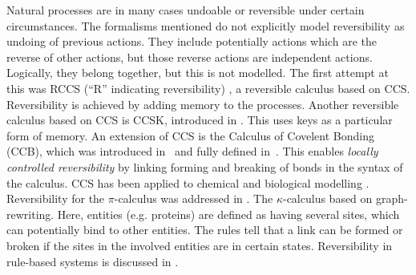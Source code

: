 Natural processes are in many cases undoable or reversible under certain circumstances. The formalisms mentioned do not explicitly model reversibility as undoing of previous actions. They include potentially actions which are the reverse of other actions, but those reverse actions are independent actions. Logically, they belong together, but this is not modelled. The first attempt at this was RCCS (“R” indicating reversibility) \cite{10.1007/978-3-540-28644-8_19}, a reversible calculus based on CCS. Reversibility is achieved by adding memory to the processes. Another reversible calculus based on CCS is CCSK, introduced in \cite{PHILLIPS200770}. This uses keys as a particular form of memory. An extension of CCS is the Calculus of Covelent Bonding (CCB), which was introduced in~\cite{KU16} and fully defined in~\cite{KU2017}. This enables \textit{locally controlled reversibility} by linking forming and breaking of bonds in the syntax of the calculus. CCS has been applied to chemical and biological modelling \cite{10.1007/978-3-319-99498-7_8}. Reversibility for the $\pi$-calculus was addressed in \cite{10.1007/978-3-642-15375-4_33}. The $\kappa$-calculus \cite{DANOS200469} based on graph-rewriting. Here, entities (e.g. proteins) are defined as having several sites, which can potentially bind to other entities. The rules tell that a link can be formed or broken if the sites in the involved entities are in certain states. Reversibility in rule-based systems is discussed in \cite{Aman2020}.